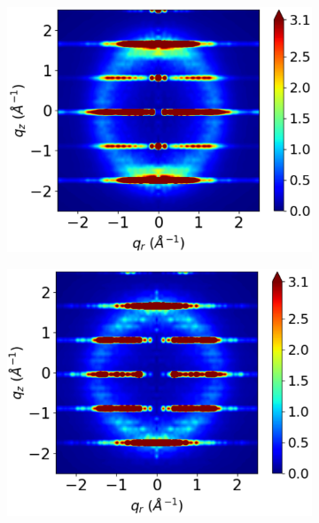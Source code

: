 \documentclass[journal=jpcbfk,manuscript=article]{achemso}
\begin{document}
\begin{figure}[!htb]
\begin{subfigure}{0.325\linewidth}
  	\label{fig:rotated_monomers_rzplot_restrained}
  \end{subfigure}
  \begin{subfigure}{0.325\linewidth}
  	\centering
  	\includegraphics[width=\textwidth]{staggered_rzplot_restrained.pdf}
  	\label{fig:staggered_rzplot_restrained}
  \end{subfigure}
  \begin{subfigure}{0.325\linewidth}
  	\centering
  	\includegraphics[width=\textwidth]{solvated_pore_rzplot_restrained.pdf}
  	\label{fig:solvated_pore_rzplot_restrained}
  \end{subfigure}

\end{figure}
\end{document}

